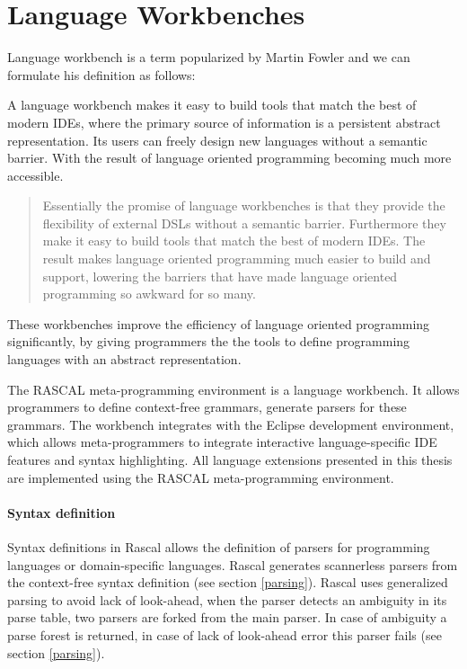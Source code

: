 \section{Language Workbenches} \label{rascal}

Language workbench is a term popularized by Martin Fowler and we can formulate his definition as follows:

A language workbench makes it easy to build tools that match the best of modern IDEs, where the primary source of information is a persistent abstract representation. Its users can freely design new languages without a semantic barrier. With the result of language oriented programming becoming much more accessible.~\cite{Fowler2005}

\blockquote[\cite{Fowler2005}]{Essentially the promise of language workbenches is that they provide the flexibility of external DSLs without a semantic barrier. Furthermore they make it easy to build tools that match the best of modern IDEs. The result makes language oriented programming much easier to build and support, lowering the barriers that have made language oriented programming so awkward for so many.}

These workbenches improve the efficiency of language oriented programming\cite{Ward1994} significantly, by giving programmers the the tools to define programming languages with an abstract representation.

The RASCAL\cite{Klint} meta-programming environment is a language workbench. It allows programmers to define context-free grammars, generate parsers for these grammars. The workbench integrates with the Eclipse development environment, which allows meta-programmers to integrate interactive language-specific IDE features and syntax highlighting. All language extensions presented in this thesis are implemented using the RASCAL meta-programming environment.

\paragraph{Syntax definition}
Syntax definitions in Rascal allows the definition of parsers for programming languages or domain-specific languages. Rascal generates scannerless parsers from the context-free syntax definition (see section \ref{parsing}). Rascal uses generalized parsing to avoid lack of look-ahead, when the parser detects an ambiguity in its parse table, two parsers are forked from the main parser. In case of ambiguity a parse forest is returned, in case of lack of look-ahead error this parser fails (see section \ref{parsing}).

